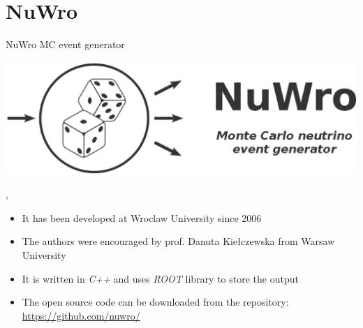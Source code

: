 \section{NuWro}

\begin{slide}[toc=NuWro MC]{NuWro MC event generator}
\null\vfill  
  
  \vspace{-10pt}
  \begin{center}
    \includegraphics[width=0.75\columnwidth]{img/nuwro.eps}
  \end{center}
  \vspace{-30pt}
  {\it\hfill{}}
  
  \sep
  
  \begin{itemize}

    \item It has been developed at Wroclaw University since 2006
    \item The authors were encouraged by prof. Danuta Kie{\l}czewska from Warsaw University
    \item It is written in {\it\small C++} and uses {\it\small ROOT} library to store the output
    \item The open source code can be downloaded from the repository: \url{https://github.com/nuwro/}
    
  \end{itemize}

\vfill\null
\end{slide}


